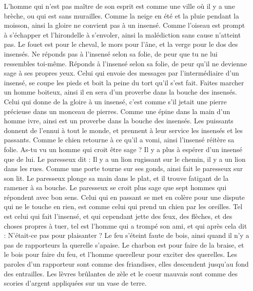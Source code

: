 \begin{multicols}{2}
L'homme qui n’est pas maître de son esprit est comme une ville où il y a une brèche, ou qui est sans murailles.
\VerseOne{}Comme la neige en été et la pluie pendant la moisson, ainsi la gloire ne convient pas à un insensé.
Comme l'oiseau est prompt à s’échapper et l'hirondelle à s’envoler, ainsi la malédiction sans cause n'atteint pas.
Le fouet est pour le cheval, le mors pour l'âne, et la verge pour le dos des insensés.
Ne réponds pas  à l’insensé selon sa folie, de peur que tu ne lui ressembles toi-même.
Réponds à l’insensé selon sa folie, de peur qu'il ne devienne sage à ses propres yeux.
Celui qui envoie des messages par l’intermédiaire d’un insensé, se coupe les pieds et boit la peine du tort qu'il s'est fait.
Faites marcher un homme boiteux, ainsi il en sera d'un proverbe dans la bouche des insensés.
Celui qui donne de la gloire à un insensé, c’est comme s'il jetait une pierre précieuse dans un monceau de pierres.
Comme une épine dans la main d'un homme ivre, ainsi est un proverbe dans la bouche des insensés.
Les puissants donnent de l'ennui à tout le monde, et prennent à leur service les insensés et les passants.
Comme le chien retourne à ce qu'il a vomi, ainsi l’insensé réitère sa folie.
As-tu vu un homme qui croit être sage ? Il y a plus à espérer d'un insensé que de lui.
Le paresseux dit : Il y a un lion rugissant sur le chemin, il y a un lion dans les rues.
Comme une porte tourne sur ses gonds, ainsi fait le paresseux sur son lit.
Le paresseux plonge sa main dans le plat, et il trouve fatigant de la ramener à sa bouche.
Le paresseux se croit plus sage que sept hommes qui répondent avec bon sens.
Celui qui en passant se met en colère pour une dispute qui ne le touche en rien, est comme celui qui prend un chien par les oreilles.
Tel est celui qui fait l'insensé, et qui cependant jette des feux, des flèches, et des choses propres à tuer,
tel est l'homme qui a trompé son ami, et qui après cela dit : N’était-ce pas pour plaisanter ?
Le feu s'éteint faute de bois, ainsi quand il n'y a pas de rapporteurs la querelle s'apaise.
Le charbon est pour faire de la braise, et le bois pour faire du feu, et l'homme querelleur pour exciter des querelles.
Les paroles d'un rapporteur sont comme des friandises, elles descendent jusqu'au fond des entrailles.
Les lèvres brûlantes de zèle et le coeur mauvais sont comme des scories d’argent appliquées sur un vase de terre.

\end{multicols}
